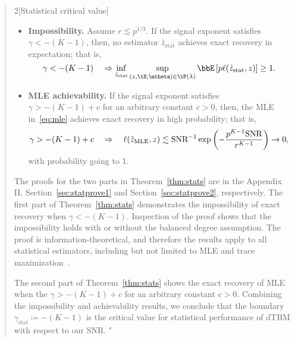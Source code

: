 \documentclass[11pt]{article}
\theoremstyle{definition}
\theoremstyle{definition}
\begin{document}
\begin{enumerate}[wide, labelwidth=!, labelindent=0pt]
\begin{quote}
\begin{customthm}{2}[Statistical critical value]
\begin{itemize}[wide]
    \item \textbf{Impossibility.} 
Assume $r\lesssim p^{1/3}$. If the signal exponent satisfies $\gamma < -(K-1)$, then, no estimator $\hat z_{\text{stat}}$ achieves exact recovery in expectation; that is,
\begin{equation}
  \gamma< -(K-1) \quad \Rightarrow  \inf_{\hat z_{\text{stat}}}\sup_{(z, \tS, \mtheta)\in\tP(\lambda)} \bbE \left[ p\ell(\hat z_{\text{stat}}, z) \right]\geq 1.
\end{equation}
\item \textbf{MLE achievability.} If the signal exponent satisfies $\gamma >-(K-1)+c$ for an arbitrary constant $c>0$, then, the MLE in~\eqref{eq:mle} achieves exact recovery in high probability; that is,
\begin{equation}
\gamma> -(K-1)+c \quad  \Rightarrow  \quad \ell(\hat z_{\text{MLE}}, z) \lesssim \text{SNR}^{-1}\exp\left(-{p^{K-1}\text{SNR}\over r^{K-1}}\right) \to 0,
\end{equation}
with probability going to 1. 
\end{itemize}
\end{customthm}

The proofs for the two parts in Theorem~\ref{thm:stats} are in the Appendix II, Section~\ref{sec:statprove1} and Section~\ref{sec:statprove2}, respectively. The first part of Theorem~\ref{thm:stats} demonstrates the impossibility of exact recovery when $\gamma < -(K-1)$. Inspection of the proof shows that the impossibility holds with or without the balanced degree assumption. %
The proof is information-theoretical, and therefore the results apply to all statistical estimators, including but not limited to MLE and trace maximization~\citep{ghoshdastidar2017uniform}. 

The second part of Theorem~\ref{thm:stats} shows the exact recovery of MLE when the $\gamma>-(K-1)+c$ for an arbitrary constant $c>0$. Combining the impossibility and achievability results, we conclude that the boundary $\gamma_{\text{stat}} \coloneqq -(K-1)$ is the critical value for statistical performance of dTBM with respect to our SNR. "
\end{quote}


\end{enumerate}
\end{document}
